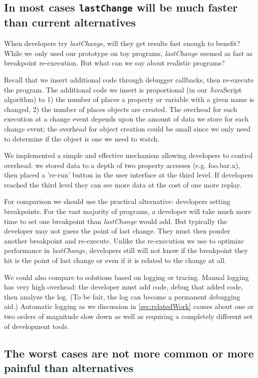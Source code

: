 \documentclass[runningheads,a4paper]{llncs}
\begin{document}
\subsection{In most cases \protect\texttt{lastChange} will be much faster than current alternatives}

When developers try \textit{lastChange}, will they get results fast
enough to benefit? While we only used our prototype on toy programs,
\textit{lastChange} seemed as fast as breakpoint re-execution.
But what can we say about realistic programs?

Recall that we
insert additional code through debugger callbacks, then re-execute the
program. The additional code we insert is proportional (in our
JavaScript algorithm) to 1) the number of places a property or
variable with a given name is changed, 2) the number of places objects
are created. The overhead for each execution at a change event
 depends upon the amount of data we store for each change event; 
the overhead for object creation could be small since we only need to 
determine if the object is one we need to watch.  

We implemented a
simple and effective mechanism allowing developers to control 
overhead: we stored data to a depth of two property accesses 
(e.g. foo.bar.x), then placed a 're-run' button 
in the user interface at the third level. If developers reached the 
third level they can see more data at the cost of one more replay.

For comparison we should use the practical alternative: developers
setting breakpoints. For the vast majority of programs, a developer
will take much more time to set one breakpoint than
\textit{lastChange} would add. But typically the developer may not
guess the point of last change. They must then ponder another
breakpoint and re-execute. Unlike the re-execution we use to 
optimize performance in \textit{lastChange}, 
developers still will not know if the breakpoint they hit is the point of last change
 or even if it is related to the change at all.

We could also compare to solutions based on logging or tracing. Manual
logging has very high overhead: the developer must add code, debug
that added code, then analyze the log. (To be fair, the log can become
a permanent debugging aid.) Automatic logging as we discussion in
\ref{sec:relatedWork} causes about one or two orders of magnitude slow down as well
as requiring a completely different set of development tools. 

\subsection{The worst cases are not more common or more painful than alternatives}
\end{document}
